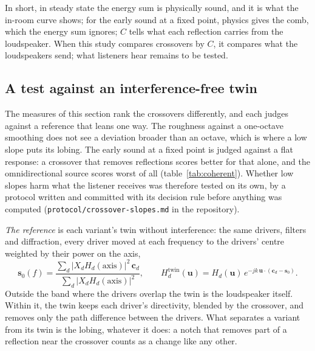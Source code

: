 \documentclass[11pt,a4paper]{article}
\newcommand{\vect}[1]{\mathbf{#1}}
\begin{document}
In short, in steady state the energy sum is physically sound, and it is what the in-room curve shows;
for the early sound at a fixed point, physics gives the comb, which the energy sum ignores; $C$ tells
what each reflection carries from the loudspeaker. When this study compares crossovers by $C$, it
compares what the loudspeakers send; what listeners hear remains to be tested.

\subsection{A test against an interference-free twin}
\label{sec:twin}

The measures of this section rank the crossovers differently, and each judges against a reference that
leans one way. The roughness against a one-octave smoothing does not see a deviation broader than an
octave, which is where a low slope puts its lobing. The early sound at a fixed point is judged against a
flat response: a crossover that removes reflections scores better for that alone, and the
omnidirectional source scores worst of all (table~\ref{tab:coherent}). Whether low slopes harm what the
listener receives was therefore tested on its own, by a protocol written and committed with its decision
rule before anything was computed (\texttt{protocol/crossover-slopes.md} in the repository).

\emph{The reference} is each variant's twin without interference: the same drivers, filters and
diffraction, every driver moved at each frequency to the drivers' centre weighted by their power on the
axis,
\begin{equation}
\vect s_0(f) = \frac{\sum_d |X_d H_d(\text{axis})|^2\,\vect c_d}{\sum_d |X_d H_d(\text{axis})|^2},
\qquad H^{\text{twin}}_d(\vect u) = H_d(\vect u)\, e^{-jk\,\vect u\cdot(\vect c_d - \vect s_0)}.
\end{equation}
Outside the band where the drivers overlap the twin is the loudspeaker itself. Within it, the twin keeps
each driver's directivity, blended by the crossover, and removes only the path difference between the
drivers. What separates a variant from its twin is the lobing, whatever it does: a notch that removes
part of a reflection near the crossover counts as a change like any other.
\end{document}
